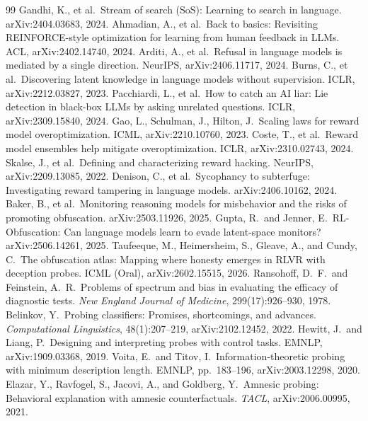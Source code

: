 \documentclass{article}
\begin{document}
\begin{thebibliography}{99}
 Gandhi, K., et al.\ Stream of search (SoS): Learning to search in language. arXiv:2404.03683, 2024.
 Ahmadian, A., et al.\ Back to basics: Revisiting REINFORCE-style optimization for learning from human feedback in LLMs. ACL, arXiv:2402.14740, 2024.
 Arditi, A., et al.\ Refusal in language models is mediated by a single direction. NeurIPS, arXiv:2406.11717, 2024.
 Burns, C., et al.\ Discovering latent knowledge in language models without supervision. ICLR, arXiv:2212.03827, 2023.
 Pacchiardi, L., et al.\ How to catch an AI liar: Lie detection in black-box LLMs by asking unrelated questions. ICLR, arXiv:2309.15840, 2024.
 Gao, L., Schulman, J., Hilton, J.\ Scaling laws for reward model overoptimization. ICML, arXiv:2210.10760, 2023.
 Coste, T., et al.\ Reward model ensembles help mitigate overoptimization. ICLR, arXiv:2310.02743, 2024.
 Skalse, J., et al.\ Defining and characterizing reward hacking. NeurIPS, arXiv:2209.13085, 2022.
 Denison, C., et al.\ Sycophancy to subterfuge: Investigating reward tampering in language models. arXiv:2406.10162, 2024.
 Baker, B., et al.\ Monitoring reasoning models for misbehavior and the risks of promoting obfuscation. arXiv:2503.11926, 2025.
 Gupta, R.\ and Jenner, E.\ RL-Obfuscation: Can language models learn to evade latent-space monitors? arXiv:2506.14261, 2025.
 Taufeeque, M., Heimersheim, S., Gleave, A., and Cundy, C.\ The obfuscation atlas: Mapping where honesty emerges in RLVR with deception probes. ICML (Oral), arXiv:2602.15515, 2026.
 Ransohoff, D.\ F.\ and Feinstein, A.\ R.\ Problems of spectrum and bias in evaluating the efficacy of diagnostic tests. \emph{New England Journal of Medicine}, 299(17):926--930, 1978.
 Belinkov, Y.\ Probing classifiers: Promises, shortcomings, and advances. \emph{Computational Linguistics}, 48(1):207--219, arXiv:2102.12452, 2022.
 Hewitt, J.\ and Liang, P.\ Designing and interpreting probes with control tasks. EMNLP, arXiv:1909.03368, 2019.
 Voita, E.\ and Titov, I.\ Information-theoretic probing with minimum description length. EMNLP, pp.\ 183--196, arXiv:2003.12298, 2020.
 Elazar, Y., Ravfogel, S., Jacovi, A., and Goldberg, Y.\ Amnesic probing: Behavioral explanation with amnesic counterfactuals. \emph{TACL}, arXiv:2006.00995, 2021.


\end{thebibliography}
\end{document}

